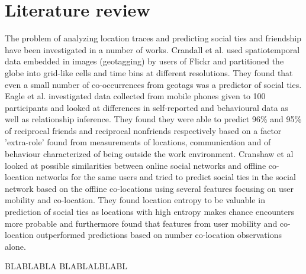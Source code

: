 \section{Literature review}
The problem of analyzing location traces and predicting social ties and friendship have been investigated in a number of works. Crandall et al.\cite{ISTfGC} used spatiotemporal data embedded in images (geotagging) by users of Flickr and partitioned the globe into grid-like cells and time bins at different resolutions. They found that even a small number of co-occurrences from geotags was a predictor of social ties. 
Eagle et al.\cite{eagle} investigated data collected from mobile phones given to 100 participants and looked at differences in self-reported and behavioural data as well as relationship inference. They found they were able to predict 96\% and 95\% of reciprocal friends and reciprocal nonfriends respectively based on a factor 'extra-role' found from measurements of locations, communication and of behaviour characterized of being outside the work environment. Cranshaw et al\cite{cranshaw2010bridging} looked at possible similarities between online social networks and offline co-location networks for the same users and tried to predict social ties in the social network based on the offline co-locations using several features focusing on user mobility and co-location. They found location entropy to be valuable in prediction of social ties as locations with high entropy makes chance encounters more probable and furthermore found that features from user mobility and co-location outperformed predictions based on number co-location observations alone.

BLABLABLA \cite{FaMUMiLBSN}
BLABLALBLABL \cite{human_mob_through_assi}